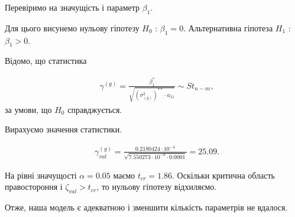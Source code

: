 \documentclass[14pt,a4paper]{scrartcl}
\theoremstyle{definition}
\theoremstyle{remark}
\theoremstyle{definition}
\theoremstyle{definition}
\begin{document}
Перевіримо на значущість і параметр $\beta_{1}$.

Для цього висунемо нульову гіпотезу $H_{0}$ : $\beta_{1} = 0$. Альтернативна гіпотеза $H_{1}$ : $\beta_{1} > 0$.

Відомо, що статистика

\begin{align*}
  & \gamma^{(g)} = \frac{\beta_{1}^{*}}{\sqrt{(\sigma_{(g)}^2)^{**}\cdot a_{11}}} \sim St_{n - m},
\end{align*} за умови, що $H_0$ справджується.

Вирахуємо значення статистики.

\begin{align*}
  & \gamma^{(g)}_{val} = \frac{0.2180424 \cdot 10^{-4}}{\sqrt{7.550273 \cdot 10^{-9} \cdot 0.0001}} = 25.09.
\end{align*}

На рівні значущості $\alpha = 0.05$ маємо $t_{cr} = 1.86$. Оскільки критична область правостороння і $\zeta_{val} > t_{cr}$, то нульову гіпотезу відхиляємо.

Отже, наша модель є адекватною і зменшити кількість параметрів не вдалося.
\end{document}
